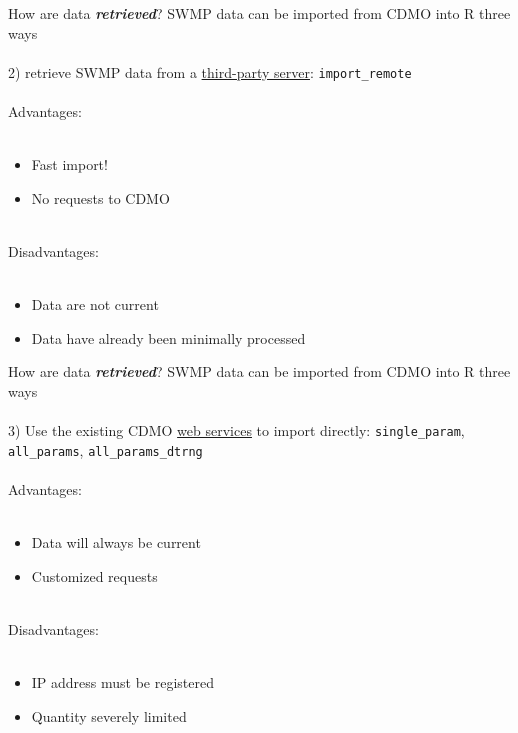 \documentclass[serif]{beamer}\usepackage[]{graphicx}\usepackage[]{color}
\newcommand{\Bigtxt}[1]{\textbf{\textit{#1}}}
\begin{document}
\begin{frame}[t]{How are data \Bigtxt{retrieved}?}
SWMP data can be imported from CDMO into R three ways\\~\\
2) retrieve SWMP data from a \href{https://s3.amazonaws.com/swmpalldata/}{third-party server}: \texttt{import\_remote} \\~\\
Advantages:\\~\\
\begin{itemize}
\item Fast import!
\item No requests to CDMO\\~\\
\end{itemize}
Disadvantages:\\~\\
\begin{itemize}
\item Data are not current
\item Data have already been minimally processed
\end{itemize}
\end{frame}

\begin{frame}[t]{How are data \Bigtxt{retrieved}?}
SWMP data can be imported from CDMO into R three ways\\~\\
3) Use the existing CDMO \href{http://cdmo.baruch.sc.edu/webservices.cfm}{web services} to import directly:  \texttt{single\_param}, \texttt{all\_params}, \texttt{all\_params\_dtrng} \\~\\
Advantages: \\~\\
\begin{itemize}
\item Data will always be current
\item Customized requests\\~\\
\end{itemize}
Disadvantages:\\~\\
\begin{itemize}
\item IP address must be registered
\item Quantity severely limited
\end{itemize}
\end{frame}
\end{document}

